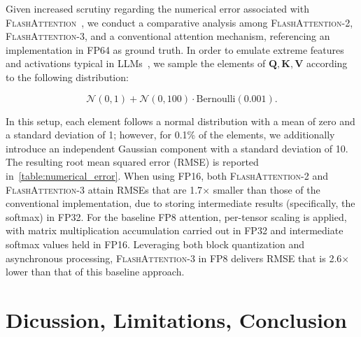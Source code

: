 \begin{itemize}
Given increased scrutiny regarding the numerical error associated with \textsc{FlashAttention}~\citep{golden2024flash}, we conduct a comparative analysis among \textsc{FlashAttention-2}, \textsc{FlashAttention-3}, and a conventional attention mechanism, referencing an implementation in FP64 as ground truth. In order to emulate extreme features and activations typical in LLMs~\citep{dettmers2208llm, sun2024massive}, we sample the elements of $\mathbf{Q}, \mathbf{K}, \mathbf{V}$ according to the following distribution:

\begin{equation*}
  \mathcal{N}(0, 1) + \mathcal{N}(0, 100) \cdot \mathrm{Bernoulli}(0.001).
\end{equation*}

In this setup, each element follows a normal distribution with a mean of zero and a standard deviation of 1; however, for 0.1\% of the elements, we additionally introduce an independent Gaussian component with a standard deviation of 10. The resulting root mean squared error (RMSE) is reported in~\cref{table:numerical_error}. When using FP16, both \textsc{FlashAttention-2} and \textsc{FlashAttention-3} attain RMSEs that are 1.7$\times$ smaller than those of the conventional implementation, due to storing intermediate results (specifically, the softmax) in FP32. For the baseline FP8 attention, per-tensor scaling is applied, with matrix multiplication accumulation carried out in FP32 and intermediate softmax values held in FP16. Leveraging both block quantization and asynchronous processing, \textsc{FlashAttention-3} in FP8 delivers RMSE that is 2.6$\times$ lower than that of this baseline approach.

\section{Dicussion, Limitations, Conclusion}
\label{sec:discussion}


\end{itemize}

